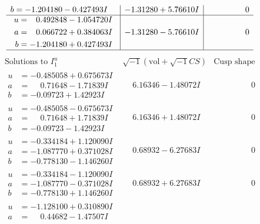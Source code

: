 \documentclass[1p]{elsarticle_modified}
\theoremstyle{definition}
\newcommand{\I}{\sqrt{-1}}
\begin{document}
$$\begin{array}{c|c|c}
\begin{aligned}
b &= -1.204180 - 0.427493 I\end{aligned}
 & -1.31280 + 5.76610 I & \phantom{-0.000000 } 0 \\ \hline\begin{aligned}
u &= \phantom{-}0.492848 - 1.054720 I \\
a &= \phantom{-}0.066722 + 0.384063 I \\
b &= -1.204180 + 0.427493 I\end{aligned}
 & -1.31280 - 5.76610 I & \phantom{-0.000000 } 0\\
 \hline 
 \end{array}$$\newpage$$\begin{array}{c|c|c}  
\text{Solutions to }I^u_{1}& \I (\text{vol} + \sqrt{-1}CS) & \text{Cusp shape}\\
 \hline 
\begin{aligned}
u &= -0.485058 + 0.675673 I \\
a &= \phantom{-}0.71648 - 1.71839 I \\
b &= -0.09723 + 1.42923 I\end{aligned}
 & \phantom{-}6.16346 - 1.48072 I & \phantom{-0.000000 } 0 \\ \hline\begin{aligned}
u &= -0.485058 - 0.675673 I \\
a &= \phantom{-}0.71648 + 1.71839 I \\
b &= -0.09723 - 1.42923 I\end{aligned}
 & \phantom{-}6.16346 + 1.48072 I & \phantom{-0.000000 } 0 \\ \hline\begin{aligned}
u &= -0.334184 + 1.120090 I \\
a &= -1.087770 + 0.371028 I \\
b &= -0.778130 - 1.146260 I\end{aligned}
 & \phantom{-}0.68932 - 6.27683 I & \phantom{-0.000000 } 0 \\ \hline\begin{aligned}
u &= -0.334184 - 1.120090 I \\
a &= -1.087770 - 0.371028 I \\
b &= -0.778130 + 1.146260 I\end{aligned}
 & \phantom{-}0.68932 + 6.27683 I & \phantom{-0.000000 } 0 \\ \hline\begin{aligned}
u &= -1.128100 + 0.310890 I \\
a &= \phantom{-}0.44682 - 1.47507 I \\

\end{aligned}
\end{array}$$
\end{document}

